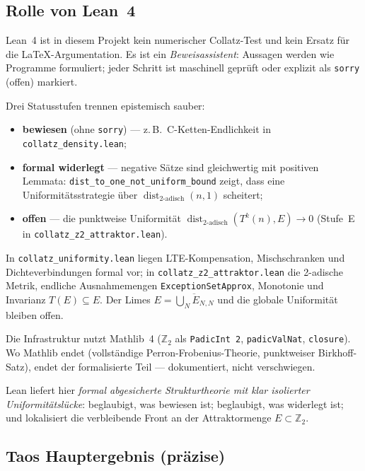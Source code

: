 \documentclass[12pt,a4paper]{article}
\newcommand{\Ztwo}{\mathbb{Z}_2}
\newcommand{\disttwo}{\operatorname{dist}_{2\text{-adisch}}}
\begin{document}
\subsection{Rolle von Lean~4}
\label{subsec:lean-rolle}

Lean~4 ist in diesem Projekt kein numerischer Collatz-Test und kein Ersatz
für die LaTeX-Argumentation. Es ist ein \emph{Beweisassistent}: Aussagen
werden wie Programme formuliert; jeder Schritt ist maschinell geprüft oder
explizit als \texttt{sorry} (offen) markiert.

Drei Statusstufen trennen epistemisch sauber:
\begin{itemize}[nosep]
  \item \textbf{bewiesen} (ohne \texttt{sorry}) --- z.\,B.\ C-Ketten-Endlichkeit
    in \texttt{collatz\_density.lean};
  \item \textbf{formal widerlegt} --- negative Sätze sind gleichwertig mit positiven
    Lemmata: \texttt{dist\_to\_one\_not\_uniform\_bound} zeigt, dass eine
    Uniformitätsstrategie über $\disttwo(n,1)$ scheitert;
  \item \textbf{offen} --- die punktweise Uniformität $\disttwo(T^k(n),E)\to 0$
    (Stufe~E in \texttt{collatz\_z2\_attraktor.lean}).
\end{itemize}

In \texttt{collatz\_uniformity.lean} liegen LTE-Kompensation, Mischschranken und
Dichteverbindungen formal vor; in \texttt{collatz\_z2\_attraktor.lean} die
2-adische Metrik, endliche Ausnahmemengen \texttt{ExceptionSetApprox}, Monotonie
und Invarianz $T(E)\subseteq E$. Der Limes
$E=\overline{\bigcup_N E_{N,N}}$ und die globale Uniformität bleiben offen.

Die Infrastruktur nutzt Mathlib~4 ($\Ztwo$ als \texttt{PadicInt~2},
\texttt{padicValNat}, \texttt{closure}). Wo Mathlib endet (vollständige
Perron-Frobenius-Theorie, punktweiser Birkhoff-Satz), endet der
formalisierte Teil --- dokumentiert, nicht verschwiegen.

\begin{tcolorbox}[kern,title={Bedeutung von Lean}]
Lean liefert hier \emph{formal abgesicherte Strukturtheorie mit klar isolierter
Uniformitätslücke}: beglaubigt, was bewiesen ist; beglaubigt, was widerlegt ist;
und lokalisiert die verbleibende Front an der Attraktormenge $E\subset\Ztwo$.
\end{tcolorbox}

\subsection{Taos Hauptergebnis (präzise)}
\end{document}
